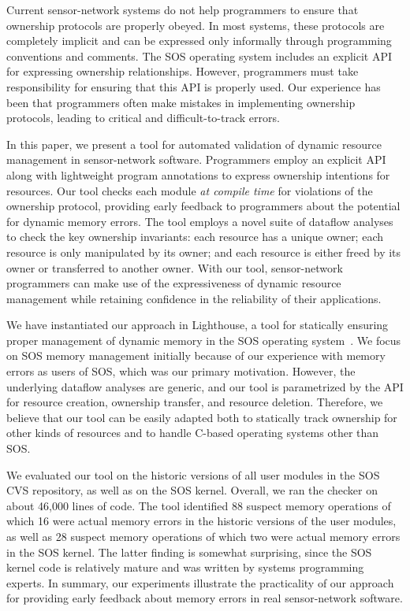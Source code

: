 Current sensor-network systems do not help programmers to ensure that
ownership protocols are properly obeyed.  In most systems, these
protocols are completely implicit and can be expressed only informally
through programming conventions and comments.  The SOS operating
system includes an explicit API for expressing ownership
relationships.  However, programmers must take responsibility for
ensuring that this API is properly used.  Our experience has been that
programmers often make mistakes in implementing ownership protocols,
leading to critical and difficult-to-track errors.  

In this paper, we present a tool for automated validation of dynamic
resource management in sensor-network software.  Programmers employ an
explicit API along with lightweight program annotations to express
ownership intentions for resources.  Our tool checks each module {\em
at compile time} for violations of the ownership protocol, providing
early feedback to programmers about the potential for dynamic memory
errors.  The tool employs a novel suite of dataflow analyses to check
the key ownership invariants:  each resource has a unique owner; each
resource is only manipulated by its owner; and each resource is either
freed by its owner or transferred to another owner.  With our tool,
sensor-network programmers can make use of the expressiveness of
dynamic resource management while retaining confidence in the
reliability of their applications.

We have instantiated our approach in Lighthouse, a tool for statically ensuring
proper management of dynamic memory in the SOS operating
system~\cite{sos}. 
We focus on SOS memory management initially because of our experience with
memory errors as users of SOS, which was our primary motivation.
However, the underlying dataflow analyses are generic, and our tool is
parametrized by the API for resource creation, ownership transfer, and
resource deletion.  Therefore, we believe that our tool can be easily
adapted both to statically track ownership for other kinds of
resources and to handle C-based operating systems other than SOS.

We evaluated our tool on the historic versions of all user modules in
the SOS CVS repository, as well as on the SOS kernel.  Overall, we ran
the checker on about 46,000 lines of code.  The tool identified 88
suspect memory operations of which 16 were actual memory errors in the
historic versions of the user modules, as well as 28 suspect memory
operations of which two were actual memory errors in the SOS kernel.
The latter finding is somewhat surprising, since the SOS kernel code
is relatively mature and was written by systems programming experts.
In summary, our experiments illustrate the practicality of our
approach for providing early feedback about memory errors in real
sensor-network software.

